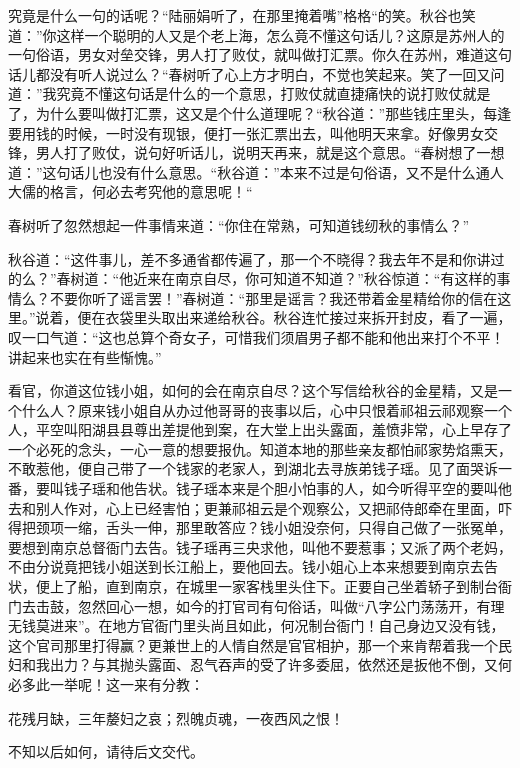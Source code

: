 \documentclass[12pt,UTF8]{ctexbook}
\begin{document}
{{{究竟是什么一句的话呢？“陆丽娟听了，在那里掩着嘴”格格“的笑。秋谷也笑道：”你这样一个聪明的人又是个老上海，怎么竟不懂这句话儿？这原是苏州人的一句俗语，男女对垒交锋，男人打了败仗，就叫做打汇票。你久在苏州，难道这句话儿都没有听人说过么？“春树听了心上方才明白，不觉也笑起来。笑了一回又问道：”我究竟不懂这句话是什么的一个意思，打败仗就直捷痛快的说打败仗就是了，为什么要叫做打汇票，这又是个什么道理呢？“秋谷道：”那些钱庄里头，每逢要用钱的时候，一时没有现银，便打一张汇票出去，叫他明天来拿。好像男女交锋，男人打了败仗，说句好听话儿，说明天再来，就是这个意思。“春树想了一想道：”这句话儿也没有什么意思。“秋谷道：”本来不过是句俗语，又不是什么通人大儒的格言，何必去考究他的意思呢！“

春树听了忽然想起一件事情来道：“你住在常熟，可知道钱纫秋的事情么？”

秋谷道：“这件事儿，差不多通省都传遍了，那一个不晓得？我去年不是和你讲过的么？”春树道：“他近来在南京自尽，你可知道不知道？”秋谷惊道：“有这样的事情么？不要你听了谣言罢！”春树道：“那里是谣言？我还带着金星精给你的信在这里。”说着，便在衣袋里头取出来递给秋谷。秋谷连忙接过来拆开封皮，看了一遍，叹一口气道：“这也总算个奇女子，可惜我们须眉男子都不能和他出来打个不平！讲起来也实在有些惭愧。”

看官，你道这位钱小姐，如何的会在南京自尽？这个写信给秋谷的金星精，又是一个什么人？原来钱小姐自从办过他哥哥的丧事以后，心中只恨着祁祖云祁观察一个人，平空叫阳湖县县尊出差提他到案，在大堂上出头露面，羞愤非常，心上早存了一个必死的念头，一心一意的想要报仇。知道本地的那些亲友都怕祁家势焰熏天，不敢惹他，便自己带了一个钱家的老家人，到湖北去寻族弟钱子瑶。见了面哭诉一番，要叫钱子瑶和他告状。钱子瑶本来是个胆小怕事的人，如今听得平空的要叫他去和别人作对，心上已经害怕；更兼祁祖云是个观察公，又把祁侍郎牵在里面，吓得把颈项一缩，舌头一伸，那里敢答应？钱小姐没奈何，只得自己做了一张冤单，要想到南京总督衙门去告。钱子瑶再三央求他，叫他不要惹事；又派了两个老妈，不由分说竟把钱小姐送到长江船上，要他回去。钱小姐心上本来想要到南京去告状，便上了船，直到南京，在城里一家客栈里头住下。正要自己坐着轿子到制台衙门去击鼓，忽然回心一想，如今的打官司有句俗话，叫做“八字公门荡荡开，有理无钱莫进来”。在地方官衙门里头尚且如此，何况制台衙门！自己身边又没有钱，这个官司那里打得赢？更兼世上的人情自然是官官相护，那一个来肯帮着我一个民妇和我出力？与其抛头露面、忍气吞声的受了许多委屈，依然还是扳他不倒，又何必多此一举呢！这一来有分教：

花残月缺，三年嫠妇之哀；烈魄贞魂，一夜西风之恨！

不知以后如何，请待后文交代。





}}}
\end{document}
